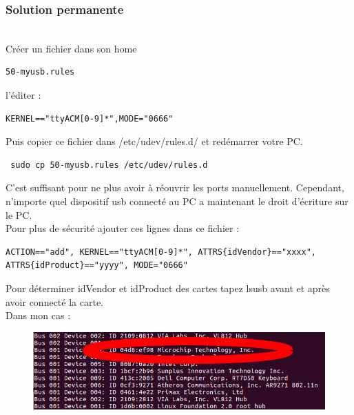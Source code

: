 \documentclass{article}
\begin{document}
\subsubsection{Solution permanente}\\

Créer un fichier dans son home

\begin{verbatim}
50-myusb.rules
\end{verbatim} 

l'éditer : 

\begin{verbatim}
KERNEL=="ttyACM[0-9]*",MODE="0666"
\end{verbatim}

Puis copier ce fichier dans /etc/udev/rules.d/ et redémarrer votre PC.

\begin{verbatim}
 sudo cp 50-myusb.rules /etc/udev/rules.d
\end{verbatim}
C'est suffisant pour ne plus avoir à réouvrir les ports manuellement. Cependant, n'importe quel dispositif usb connecté au PC a maintenant le droit d'écriture sur le PC. \\

Pour plus de sécurité ajouter ces lignes dans ce fichier :

\begin{verbatim}
ACTION=="add", KERNEL=="ttyACM[0-9]*", ATTRS{idVendor}=="xxxx", 
ATTRS{idProduct}=="yyyy", MODE="0666"
\end{verbatim}
 
 Pour déterminer idVendor et idProduct des cartes tapez lsusb avant et après avoir connecté la carte. \\

 Dans mon cas :
 
 \begin{figure}[H]
\begin{center}
\advance\leftskip-3cm
\advance\rightskip-3cm
\includegraphics[keepaspectratio=true,scale=0.5]{lsusb.png}
\label{visina8}
\end{center}\end{figure}
\end{document}
